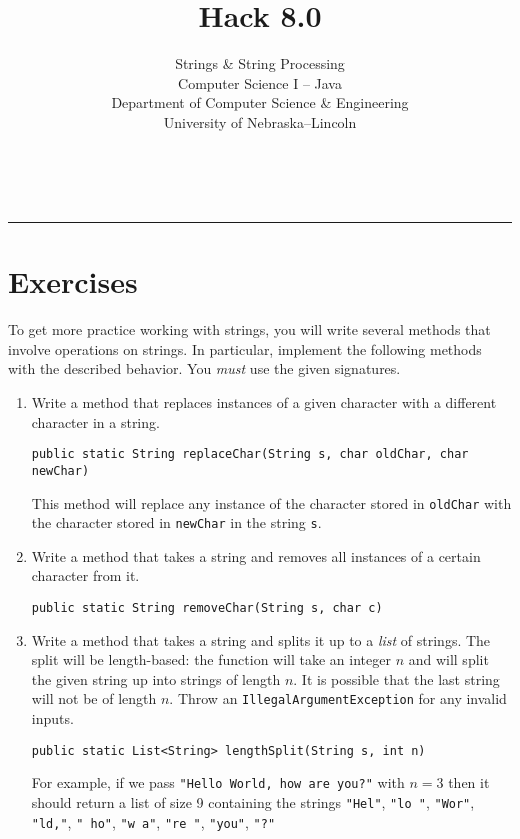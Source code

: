 \documentclass[12pt]{scrartcl}
\title{Hack 8.0}\let\Title\@title
\subtitle{Strings \& String Processing\\
Computer Science I -- Java\\
{\small
\vskip1cm
Department of Computer Science \& Engineering \\
University of Nebraska--Lincoln}
\vskip-1cm}
\date{~}
\begin{document}
\maketitle

\hrule



\section*{Exercises}

To get more practice working with strings, you will write several 
methods that involve operations on strings.  In particular, implement
the following methods with the described behavior.  You \emph{must}
use the given signatures.

\begin{enumerate}

  \item Write a method that replaces instances of a given character 
  with a different character in a string.
  
  \texttt{public static String replaceChar(String s, char oldChar, char newChar)}
  
  This method will replace any instance of the character stored in 
  \texttt{oldChar} with the character stored in \texttt{newChar} 
  in the string \texttt{s}.  

  \item Write a method that takes a string and removes all instances 
  of a certain character from it.
  
  \texttt{public static String removeChar(String s, char c)}

  \item Write a method that takes a string and splits it up to a 
  \emph{list} of strings.  The split will be length-based: the function 
  will take an integer $n$ and will split the given string up into 
  strings of length $n$.  It is possible that the last string will not 
  be of length $n$.  Throw an \texttt{IllegalArgumentException} for any invalid inputs.
  
  \texttt{public static List<String> lengthSplit(String s, int n)}

  For example, if we pass \texttt{"Hello World, how are you?"} with 
  $n = 3$ then it 
  should return a list of size 9 containing the strings \texttt{"Hel"}, \texttt{"lo "}, \texttt{"Wor"}, 
\texttt{"ld,"}, \texttt{" ho"}, \texttt{"w a"}, \texttt{"re "}, \texttt{"you"}, \texttt{"?"}

\end{enumerate}
\end{document}
